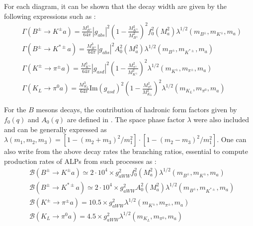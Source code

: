 		For each diagram, it can be shown that the decay width are given by the following expressions such as \cite{ALPs_general}: 
		\begin{equation}
			\begin{split}
				&\Gamma(B^\pm \rightarrow K^\pm a) = \frac{M_{B^\pm}^3}{64 \pi} \left| g_{abs} \right|^2 \left( 1- \frac{M_{K^\pm}^2}{M_{B^\pm}^2} \right)^2 f_0^2(M_a^2) \lambda^{1/2}(m_{B^\pm}, m_{K^\pm}, m_a) \\
				&\Gamma(B^\pm \rightarrow K^{*\pm} a) = \frac{M_{B^\pm}^3}{64 \pi} \left| g_{abs} \right|^2 A_0^2(M_a^2) \lambda^{1/2}(m_{B^\pm}, m_{K^{*\pm}},m_a) \\
				&\Gamma(K^\pm \rightarrow \pi^\pm a) = \frac{M_{K^\pm}^3}{64 \pi} \left| g_{asd} \right|^2 \left( 1- \frac{M_{\pi^\pm}^2}{M_{K^{\pm}}^2} \right)^2 \lambda^{1/2}(m_{K^\pm}, m_{\pi^\pm}, m_a) \\
				&\Gamma(K_L \rightarrow \pi^0 a) = \frac{M_{K_L}^3}{64 \pi} \text{Im}\left( g_{asd} \right)^2 \left( 1- \frac{M_{\pi^0}^2}{M_{K_L}^2} \right)^2 \lambda^{1/2}(m_{K_L}, m_{\pi^0}, m_a)
			\end{split}
		\end{equation}
		
		For the $B$ mesons decays, the contribution of hadronic form factors given by $f_0(q)$ and $A_0(q)$ are defined in \cite{ALPs_general}. The space phase factor $\lambda$ were also included and can be generally expressed as $\lambda(m_1, m_2, m_3) = \left[ 1- {(m_2 + m_3)^2}/{m_1^2} \right] \cdot \left[  1- {(m_2 - m_3)^2}/{m_1^2} \right]$. One can also write from the above decay rates the branching ratios, essential to compute production rates of ALPs from such processes as \cite{ALPs_general}:
		\begin{equation}
			\begin{split}
				& \mathcal{B}(B^\pm \rightarrow K^\pm a) \simeq 2\cdot 10^4 \times g_{aWW}^2 f_0^2(M_a^2) \lambda^{1/2}(m_{B^\pm}, m_{K^\pm}, m_a) \\
				& \mathcal{B}(B^\pm \rightarrow K^{*\pm} a) \simeq 2 \cdot 10^4 \times g_{aWW}^2 A_0^2(M_a^2) \lambda^{1/2}(m_{B^\pm}, m_{K^{*\pm}},m_a) \\
				& \mathcal{B}(K^\pm \rightarrow \pi^\pm a) = 10.5 \times g_{aWW}^2 \lambda^{1/2}(m_{K^\pm}, m_{\pi^\pm}, m_a) \\
				&\mathcal{B}(K_L \rightarrow \pi^0 a) = 4.5 \times g_{aWW}^2 \lambda^{1/2}(m_{K_L}, m_{\pi^0}, m_a)
			\end{split}
			\label{eq:BR_ALP}
		\end{equation}  
		
